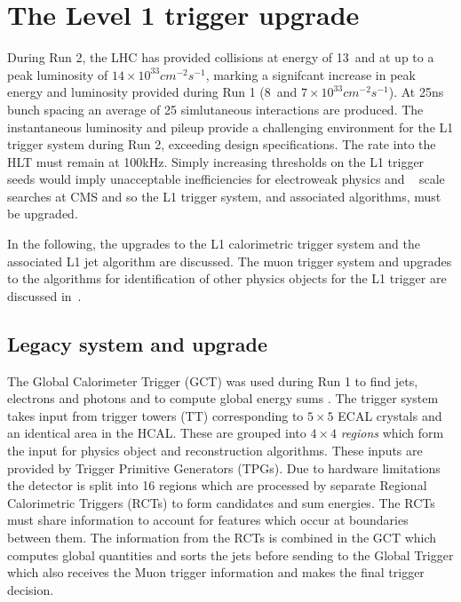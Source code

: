 \chapter{The Level 1 trigger upgrade} %
\label{sec:triggerUpgrade}

During Run 2, the LHC has provided collisions at energy of 13\TeV~and at up 
to a peak luminosity of $14\times10^{33}cm^{-2}s^{-1}$, marking a signifcant increase
in peak energy and luminosity provided during Run 1 (8\TeV~and $7\times10^{33}cm^{-2}s^{-1}$).
At 25ns bunch spacing an average of 25 simlutaneous interactions are produced.
The instantaneous luminosity and pileup provide a challenging environment for the L1 trigger system
during Run 2, exceeding design specifications. The rate into the HLT must 
remain at 100kHz. Simply increasing thresholds on the L1 trigger seeds would imply
unacceptable inefficiencies for electroweak physics and \TeV~ scale searches
at CMS and so the L1 trigger system, and associated algorithms, must be upgraded. 

In the following, the upgrades to the L1 calorimetric trigger system and the 
associated L1 jet algorithm are discussed. The muon trigger system 
and upgrades to the algorithms for identification of other physics objects for the L1 trigger are discussed 
in~\cite{ele_algo,tau_algo,muon_algo}.


\section{Legacy system and upgrade}

The Global Calorimeter Trigger (GCT) was used during Run 1 to find jets, electrons and photons and to 
compute global energy sums \cite{gct}. The trigger system takes input from trigger towers (TT) corresponding to $5\times5$ ECAL crystals 
and an identical area in the HCAL. These are grouped into $4\times4$ \emph{regions} which form the input for physics object and
reconstruction algorithms. These inputs are provided by Trigger Primitive Generators (TPGs). 
Due to hardware limitations the detector is split into 16 
regions which are processed by separate Regional Calorimetric Triggers (RCTs) to form candidates and sum 
energies. The RCTs must share information to account for features which occur at boundaries between 
them. The information from the RCTs is combined in the GCT which computes global quantities and sorts 
the jets before sending to the Global Trigger which also receives the Muon trigger
information and makes the final trigger decision. 

